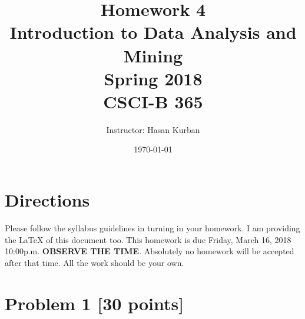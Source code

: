 \documentclass{article}
\begin{document}
\title{Homework 4\\ Introduction to Data Analysis and Mining \\ Spring 2018\\ CSCI-B 365}         %
\author{Instructor: Hasan Kurban}        %
\date{\today}          %
\maketitle
\makeatother     %
\pagestyle{plain}
\section*{Directions}
Please follow the syllabus guidelines in turning in your homework.  I am providing the \LaTeX{} of this document too. This homework is due Friday, March  16, 2018 10:00p.m. \textbf{OBSERVE THE  TIME}. Absolutely no homework will be accepted after that time. All the work should be your own.  
 


  \section*{Problem 1 [30 points]}  
  
\end{document}
